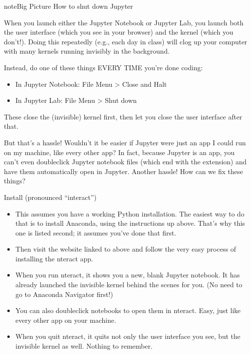 \documentclass[letterpaper,10pt,english]{sphinxmanual}
\begin{document}
\begin{sphinxadmonition}{note}{Big Picture \sphinxhyphen{} How to shut down Jupyter}

When you launch either the Jupyter Notebook or Jupyter Lab, you launch both the user interface (which you see in your browser) and the kernel (which you don’t!).    Doing this repeatedly (e.g., each day in class) will clog up your computer with many kernels running invisibly in the background.

Instead, do one of these things EVERY TIME you’re done coding:
\begin{itemize}
\item {} 
In Jupyter Notebook: File Menu > Close and Halt

\item {} 
In Jupyter Lab: File Menu > Shut down

\end{itemize}

These close the (invisible) kernel first, then let you close the user interface after that.
\end{sphinxadmonition}

But that’s a hassle!  Wouldn’t it be easier if Jupyter were just an app I could run on my machine, like every other app?  In fact, because Jupyter is  an app, you can’t even double\sphinxhyphen{}click Jupyter notebook files (which end with the  extension) and have them automatically open in Jupyter.  Another hassle!  How can we fix these things?

  Install  (pronounced “interact”)
\begin{itemize}
\item {} 
This assumes you have a working Python installation.  The easiest way to do that is to install Anaconda, using the instructions up above.  That’s why this one is listed second; it assumes you’ve done that first.

\item {} 
Then visit the website linked to above and follow the very easy process of installing the nteract app.

\item {} 
When you run nteract, it shows you a new, blank Jupyter notebook.  It has already launched the invisible kernel behind the scenes for you.  (No need to go to Anaconda Navigator first!)

\item {} 
You can also double\sphinxhyphen{}click notebooks to open them in nteract.  Easy, just like every other app on your machine.

\item {} 
When you quit nteract, it quits not only the user interface you see, but the invisible kernel as well.  Nothing to remember.

\end{itemize}
\end{document}
